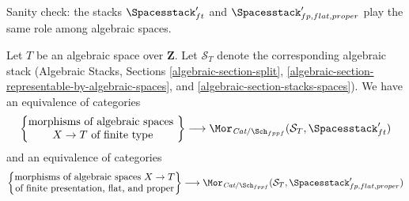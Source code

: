 \noindent
Sanity check: the stacks $\Spacesstack'_{ft}$ and
$\Spacesstack'_{fp, flat, proper}$
play the same role among algebraic spaces.

\begin{lemma}
\label{lemma-extend-spaces-to-spaces}
Let $T$ be an algebraic space over $\mathbf{Z}$. Let $\mathcal{S}_T$
denote the corresponding algebraic stack (Algebraic Stacks, Sections
\ref{algebraic-section-split},
\ref{algebraic-section-representable-by-algebraic-spaces}, and
\ref{algebraic-section-stacks-spaces}).
We have an equivalence of categories
$$
\left\{
\begin{matrix}
\text{morphisms of algebraic spaces }\\
X \to T\text{ of finite type}
\end{matrix}
\right\}
\longrightarrow
\Mor_{\textit{Cat}/\Sch_{fppf}}(\mathcal{S}_T, \Spacesstack'_{ft})
$$
and an equivalence of categories
$$
\left\{
\begin{matrix}
\text{morphisms of algebraic spaces }X \to T\\
\text{of finite presentation, flat, and proper}
\end{matrix}
\right\}
\longrightarrow
\Mor_{\textit{Cat}/\Sch_{fppf}}(\mathcal{S}_T,
\Spacesstack'_{fp, flat, proper})
$$
\end{lemma}

